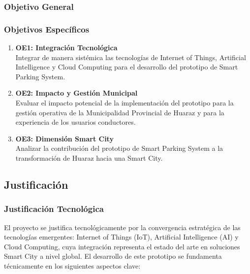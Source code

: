 \documentclass[12pt,a4paper]{article}
\begin{document}
\newcommand{\objetivoEspecificoUno}{Integrar de manera sistémica las tecnologías de Internet of Things, Artificial Intelligence y Cloud Computing para el desarrollo del prototipo de Smart Parking System.}

\newcommand{\objetivoEspecificoDos}{Evaluar el impacto potencial de la implementación del prototipo para la gestión operativa de la Municipalidad Provincial de Huaraz y para la experiencia de los usuarios conductores.}

\newcommand{\objetivoEspecificoTres}{Analizar la contribución del prototipo de Smart Parking System a la transformación de Huaraz hacia una Smart City.}

\subsubsection{Objetivo General}
\objetivoGeneral{}

\subsubsection{Objetivos Específicos}
\begin{enumerate}
	\item \textbf{OE1: Integración Tecnológica}\\
	\objetivoEspecificoUno{}
	
	\item \textbf{OE2: Impacto y Gestión Municipal}\\
	\objetivoEspecificoDos

	\item \textbf{OE3: Dimensión Smart City}\\
	\objetivoEspecificoTres
\end{enumerate}

\subsection{Justificación}

\subsubsection{Justificación Tecnológica}
El proyecto se justifica tecnológicamente por la convergencia estratégica de las tecnologías emergentes: Internet of Things (IoT), Artificial Intelligence (AI) y Cloud Computing, cuya integración representa el estado del arte en soluciones Smart City a nivel global. El desarrollo de este prototipo se fundamenta técnicamente en los siguientes aspectos clave:
\end{document}
